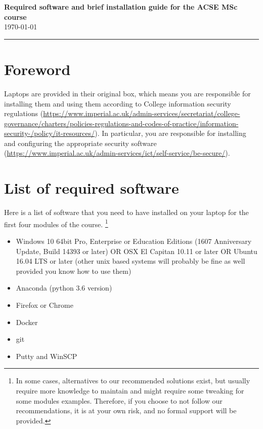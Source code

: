 \documentclass[11pt]{article}
\begin{document}
\begin{center}
{\bf \Large Required software and brief installation guide for the ACSE MSc course } \\ \today
\end{center}
\hrule
\vspace*{1cm}


\section{Foreword}

Laptops are provided in their original box, which means you are responsible for installing them and using them according to College information security regulations (\url{https://www.imperial.ac.uk/admin-services/secretariat/college-governance/charters/policies-regulations-and-codes-of-practice/information-security-/policy/it-resources/}). 
In particular, you are responsible for installing and configuring the appropriate security software (\url{https://www.imperial.ac.uk/admin-services/ict/self-service/be-secure/}).


\section{List of required software}

Here is a list of  software that you need to have installed on your laptop for the first four modules of the course.
\footnote{In some cases, alternatives to our recommended solutions exist, but usually require more knowledge to maintain and might require some tweaking for some modules examples. 
Therefore, if you choose to not follow our recommendations, it is at your own risk, and no formal support will be provided.}

\begin{itemize}
  \item Windows 10  64bit Pro, Enterprise or Education Editions (1607 Anniversary Update, Build 14393 or later) OR OSX  El Capitan 10.11 or later OR Ubuntu 16.04 LTS or later (other unix based systems will probably be fine as well provided you know how to use them)
  \item Anaconda (python 3.6 version)
  \item Firefox or Chrome
  \item Docker
  \item git
  \item Putty and WinSCP
\end{itemize}
\end{document}
